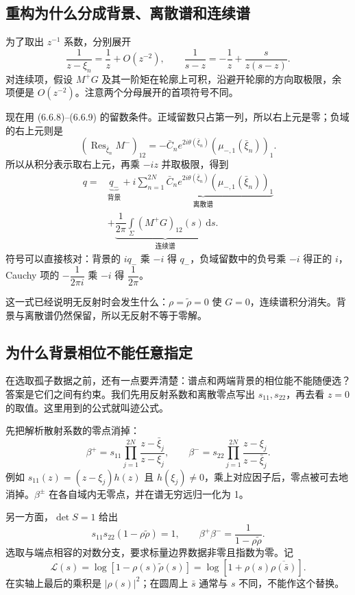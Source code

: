 \documentclass[lang=cn,scheme=chinese,mode=simple,device=normal,color=blue,math=cm,thmcnt=section,12pt]{elegantbook}
\DeclareMathOperator*{\Res}{Res}
\newcommand{\dd}{\,\mathrm{d}}
\newcommand{\eqq}[2]{\tag{#1}\label{eq:#1}#2}
\begin{document}
\subsection*{重构为什么分成背景、离散谱和连续谱}
为了取出 $z^{-1}$ 系数，分别展开
\[
\dfrac{1}{z-\xi_n}=\dfrac{1}{z}+O(z^{-2}),\qquad
\dfrac{1}{s-z}=-\dfrac{1}{z}+\dfrac{s}{z(s-z)}.
\]
对连续项，假设 $M^+G$ 及其一阶矩在轮廓上可积，沿避开轮廓的方向取极限，余项便是 $O(z^{-2})$。注意两个分母展开的首项符号不同。

现在用 (6.6.8)--(6.6.9) 的留数条件。正域留数只占第一列，所以右上元是零；负域的右上元则是
\[
(\Res_{\bar\xi_n}M^-)_{12}
=-\bar C_ne^{2i\theta(\bar\xi_n)}(\mu_{-,1}(\bar\xi_n))_1.
\]
所以从积分表示取右上元，再乘 $-iz$ 并取极限，得到
\begin{equation}\eqq{6.7.6}{
\begin{aligned}
q={}&\underbrace{q_-}_{\text{背景}}
+\underbrace{i\sum\limits_{n=1}^{2N}\bar C_ne^{2i\theta(\bar\xi_n)}
(\mu_{-,1}(\bar\xi_n))_1}_{\text{离散谱}}\\
&+\underbrace{\dfrac{1}{2\pi}\int\limits_\Sigma(M^+G)_{12}(s)\dd s}_{\text{连续谱}}.
\end{aligned}}\end{equation}
符号可以直接核对：背景的 $iq_-$ 乘 $-i$ 得 $q_-$，负域留数中的负号乘 $-i$ 得正的 $i$，Cauchy 项的 $-\dfrac{1}{2\pi i}$ 乘 $-i$ 得 $\dfrac{1}{2\pi}$。

这一式已经说明无反射时会发生什么：$\rho=\widetilde\rho=0$ 使 $G=0$，连续谱积分消失。背景与离散谱仍然保留，所以无反射不等于零解。

\subsection*{为什么背景相位不能任意指定}
在选取孤子数据之前，还有一点要弄清楚：谱点和两端背景的相位能不能随便选？答案是它们之间有约束。我们先用反射系数和离散零点写出 $s_{11},s_{22}$，再去看 $z=0$ 的取值。这里用到的公式就叫迹公式。

先把解析散射系数的零点消掉：
\begin{equation}\eqq{6.7.7}{\beta^+=s_{11}\prod\limits_{j=1}^{2N}
\dfrac{z-\bar\xi_j}{z-\xi_j},\qquad
\beta^-=s_{22}\prod\limits_{j=1}^{2N}
\dfrac{z-\xi_j}{z-\bar\xi_j}.}\end{equation}
例如 $s_{11}(z)=(z-\xi_j)h(z)$ 且 $h(\xi_j)\ne0$，乘上对应因子后，零点被可去地消掉。$\beta^\pm$ 在各自域内无零点，并在谱无穷远归一化为 1。

另一方面，$\det S=1$ 给出
\[
s_{11}s_{22}(1-\rho\widetilde\rho)=1,\qquad
\beta^+\beta^-=\dfrac{1}{1-\rho\widetilde\rho}.
\]
选取与端点相容的对数分支，要求标量边界数据非零且指数为零。记
\[
\mathcal L(s)=\log[1-\rho(s)\widetilde\rho(s)]
=\log[1+\rho(s)\overline{\rho(\bar s)}].
\]
在实轴上最后的乘积是 $|\rho(s)|^2$；在圆周上 $\bar s$ 通常与 $s$ 不同，不能作这个替换。
\end{document}

